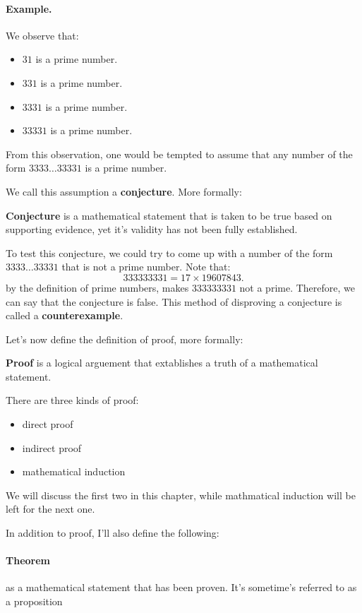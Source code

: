\documentclass[a4paper]{article}
\begin{document}
\paragraph{Example.}We observe that:
\begin{itemize}
	\item $31$ is a prime number.
	\item $331$ is a prime number.
	\item $3331$ is a prime number.
	\item  $33331$ is a prime number.
\end{itemize}
From this observation, one would be tempted to assume that any number of the form $3333 \ldots 33331$ is a prime number.
	
\noindent We call this assumption a \textbf{conjecture}. More formally:
\begin{tcolorbox}[title=Definition]
\textbf{Conjecture} is a mathematical statement that is taken to be true based on supporting evidence, yet it's  validity has not been fully established.
	
\end{tcolorbox}
To test this conjecture, we could try to come up with a number of the form $3333 \ldots 33331$ that is not a prime number. Note that:
 \[
333333331 = 17 \times 19607843
.\] 
by the definition of prime numbers, makes $333333331$ not a prime. Therefore, we can say that the conjecture is false. This method of disproving a conjecture is called a \textbf{counterexample}.

Let's now define the definition of proof, more formally:
\begin{tcolorbox}[title=Definition]
	\textbf{Proof} is a logical arguement that extablishes a truth of a mathematical statement.	
\end{tcolorbox}
\noindent There are three kinds of proof:
\begin{itemize}
	\item direct proof
	\item indirect proof
	\item mathematical induction
\end{itemize}
We will discuss the first two in this chapter, while mathmatical induction will be left for the next one.

\noindent In addition to proof, I'll also define the following:

\paragraph{Theorem} as a mathematical statement that has been proven. It's sometime's referred to as a proposition
\end{document}
